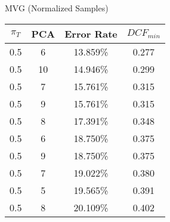 \caption{MVG (Normalized Samples)}\label{tab:mvgn_acctable}
\begin{center}
\begin{tabular}{|c|c|c|c|}
\hline
$\pi_T$ & PCA & Error Rate & $DCF_{min}$\\
\hline
0.5 & 6 & 13.859\% & 0.277\\
\hline
0.5 & 10 & 14.946\% & 0.299\\
\hline
0.5 & 7 & 15.761\% & 0.315\\
\hline
0.5 & 9 & 15.761\% & 0.315\\
\hline
0.5 & 8 & 17.391\% & 0.348\\
\hline
0.5 & 6 & 18.750\% & 0.375\\
\hline
0.5 & 9 & 18.750\% & 0.375\\
\hline
0.5 & 7 & 19.022\% & 0.380\\
\hline
0.5 & 5 & 19.565\% & 0.391\\
\hline
0.5 & 8 & 20.109\% & 0.402\\
\hline
\end{tabular}
\end{center}
